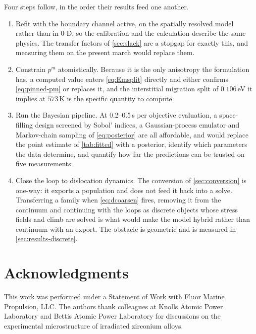 Four steps follow, in the order their results feed one another.

\begin{enumerate}[itemsep=3pt]
\item Refit with the boundary channel active, on the spatially resolved model
      rather than in $0$-D, so the calibration and the calculation describe the
      same physics. The transfer factors of \cref{sec:slack} are a stopgap for
      exactly this, and measuring them on the present march would replace them.
\item Constrain $p^{m}$ atomistically. Because it is the only anisotropy the
      formulation has, a computed value enters \cref{eq:Emsplit} directly and
      either confirms \cref{eq:pinned-pm} or replaces it, and the interstitial
      migration split of $0.106\,$eV it implies at $573\,$K is the specific
      quantity to compute.
\item Run the Bayesian pipeline. At 0.2--0.5\,s per objective evaluation, a
      space-filling design screened by Sobol' indices, a Gaussian-process
      emulator and Markov-chain sampling of \cref{eq:posterior} are all
      affordable, and would replace the point estimate of \cref{tab:fitted} with
      a posterior, identify which parameters the data determine, and quantify how
      far the \cloop{} predictions can be trusted on five measurements.
\item Close the loop to dislocation dynamics. The conversion of
      \cref{sec:conversion} is one-way: it exports a population and does not feed
      it back into a solve. Transferring a family when \cref{eq:dcoarsen} fires,
      removing it from the continuum and continuing with the loops as discrete
      objects whose stress fields and climb are solved is what would make the
      model hybrid rather than continuum with an export. The obstacle is
      geometric and is measured in \cref{sec:results-discrete}.
\end{enumerate}

\section*{Acknowledgments}

This work was performed under a Statement of Work with Fluor Marine Propulsion,
LLC. The authors thank colleagues at Knolls Atomic Power Laboratory and Bettis
Atomic Power Laboratory for discussions on the experimental microstructure of
irradiated zirconium alloys.
